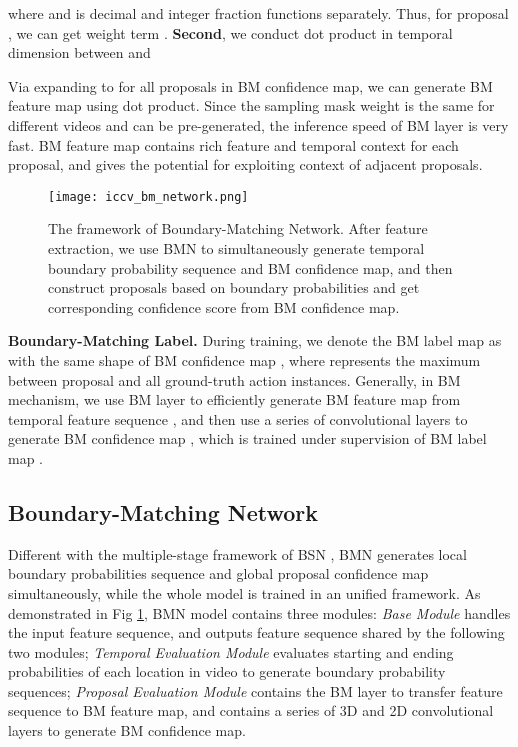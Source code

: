 \documentclass[10pt,twocolumn,letterpaper]{article}
\begin{document}
where  and  is decimal and integer fraction functions separately.
Thus, for proposal , we can get weight term .
\textbf{Second}, we conduct dot product in temporal dimension between  and 
 


Via expanding  to  for all proposals in BM confidence map, we can generate BM feature map  using dot product. 
Since the sampling mask weight  is the same for different videos and can be pre-generated, the inference speed of BM layer is very fast.
BM feature map contains rich feature and temporal context for each proposal, and gives the potential for exploiting context of adjacent proposals.


\begin{figure}[t]
\begin{center}
\begin{minipage}[b]{1.0\linewidth}
  \centering
  \centerline{\texttt{[image: iccv\_bm\_network.png]}}
  \medskip
\end{minipage}
\end{center}
   \caption{The framework of Boundary-Matching Network. After feature extraction, we use BMN to simultaneously generate temporal boundary probability sequence and BM confidence map, and then construct proposals based on boundary probabilities and get corresponding confidence score from BM confidence map.}
\label{fig:bmn_framework}
\end{figure}

\noindent
\textbf{Boundary-Matching Label.} 
During training, we  denote the BM label map as  with the same shape of BM confidence map , where  represents the maximum  between proposal  and all ground-truth action instances.
Generally, in BM mechanism, we use BM layer to efficiently generate BM feature map  from temporal feature sequence , and then use a series of convolutional layers to generate BM confidence map , which is trained under supervision of BM label map .



\subsection{Boundary-Matching Network}

Different with the multiple-stage framework of  BSN \cite{lin2018bsn}, BMN generates local boundary probabilities sequence and global proposal confidence map simultaneously, while the whole model is trained in an unified framework.
As demonstrated in Fig \ref{fig:bmn_framework}, BMN model contains three modules: \emph{Base Module } handles the input feature sequence, and outputs feature sequence shared by the following two modules; \emph{Temporal Evaluation Module } evaluates starting and ending probabilities of each location in video to generate boundary probability sequences; 
\emph{Proposal Evaluation Module } contains the BM layer to transfer feature sequence to  BM feature map, and contains a series of 3D and 2D convolutional layers to generate BM confidence map.
\end{document}
